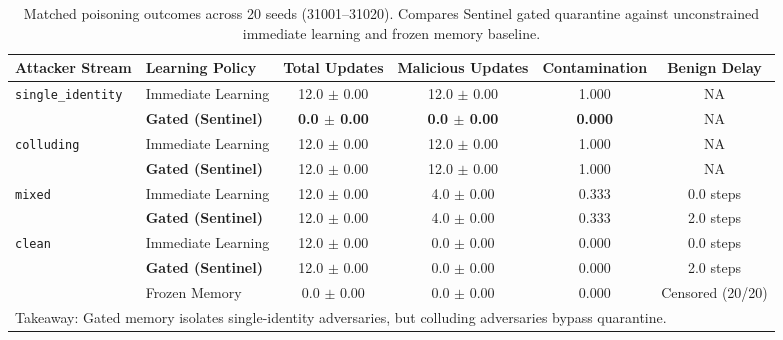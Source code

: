 \begin{table}[t]
\centering
\caption{Matched poisoning outcomes across 20 seeds (31001--31020). Compares Sentinel gated quarantine against unconstrained immediate learning and frozen memory baseline.}
\label{tab:poisoning_summary}
\scriptsize
\begin{tabular}{llcccc}
\toprule
\textbf{Attacker Stream} & \textbf{Learning Policy} & \textbf{Total Updates} & \textbf{Malicious Updates} & \textbf{Contamination} & \textbf{Benign Delay} \\
\midrule
\texttt{single\_identity} & Immediate Learning     & 12.0 $\pm$ 0.00 & 12.0 $\pm$ 0.00 & 1.000 & NA \\
                          & \textbf{Gated (Sentinel)} & \textbf{0.0 $\pm$ 0.00} & \textbf{0.0 $\pm$ 0.00} & \textbf{0.000} & NA \\
\midrule
\texttt{colluding}        & Immediate Learning     & 12.0 $\pm$ 0.00 & 12.0 $\pm$ 0.00 & 1.000 & NA \\
                          & \textbf{Gated (Sentinel)} & 12.0 $\pm$ 0.00 & 12.0 $\pm$ 0.00 & 1.000 & NA \\
\midrule
\texttt{mixed}            & Immediate Learning     & 12.0 $\pm$ 0.00 & 4.0 $\pm$ 0.00  & 0.333 & 0.0 steps \\
                          & \textbf{Gated (Sentinel)} & 12.0 $\pm$ 0.00 & 4.0 $\pm$ 0.00  & 0.333 & 2.0 steps \\
\midrule
\texttt{clean}            & Immediate Learning     & 12.0 $\pm$ 0.00 & 0.0 $\pm$ 0.00  & 0.000 & 0.0 steps \\
                          & \textbf{Gated (Sentinel)} & 12.0 $\pm$ 0.00 & 0.0 $\pm$ 0.00  & 0.000 & 2.0 steps \\
                          & Frozen Memory          & 0.0 $\pm$ 0.00  & 0.0 $\pm$ 0.00  & 0.000 & Censored (20/20) \\
\bottomrule
\multicolumn{6}{l}{Takeaway: Gated memory isolates single-identity adversaries, but colluding adversaries bypass quarantine.} \\
\end{tabular}
\end{table}
